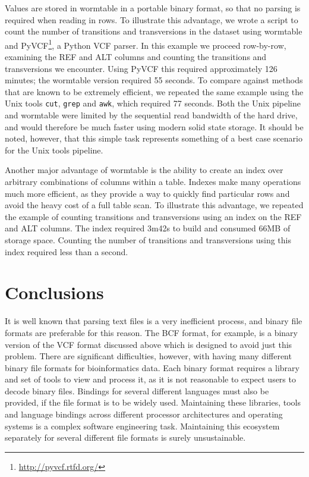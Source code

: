 \documentclass{bioinfo}
\begin{document}
Values are stored in wormtable in a portable binary format, so that no parsing is
required when reading in rows. To illustrate this advantage, we
wrote a script to count the number of transitions and transversions
in the dataset using wormtable and PyVCF\footnote{%
\href{http://pyvcf.rtfd.org/}{http://pyvcf.rtfd.org/}}, 
a Python VCF parser.
In this example we proceed 
row-by-row, examining the REF and ALT columns and
counting the transitions and transversions we encounter. 
Using PyVCF this required approximately 126 minutes;
the wormtable version required
55 seconds. To compare against methods that are known to be extremely
efficient, we repeated the same 
example using the Unix tools \texttt{cut}, \texttt{grep} 
and \texttt{awk},  which required 77 seconds. Both the
Unix pipeline and wormtable were limited by the sequential read
bandwidth of the hard drive, and would therefore be much 
faster using modern solid state storage.
It should be noted, however, that this simple task represents 
something of a best case scenario for the Unix tools pipeline.

Another major advantage of wormtable is the ability to create 
an index over arbitrary combinations of columns within a table.
Indexes make many operations much more efficient, as they provide 
a way to quickly find particular rows and avoid the 
heavy cost of a full table scan.
To illustrate this advantage, we repeated the example 
of counting transitions and transversions using an index 
on the REF and ALT columns.
The index required 3m42s to build and 
consumed 66MB of storage space. Counting the number of 
transitions and transversions using this index required 
less than a second.

\section{Conclusions}
It is well known that parsing text files is a very inefficient process, 
and binary file formats are preferable for this reason. The BCF format,
for example, is a binary version of the VCF format discussed above which 
is designed to avoid just this problem. There are significant difficulties,
however, with having many different binary file formats for bioinformatics 
data. Each binary format requires a library and set of tools to view 
and process it, as it is not reasonable to expect users to decode binary
files. Bindings for several different languages must also be provided, if 
the file format is to be widely used.
Maintaining these libraries, tools and language bindings across 
different processor architectures and operating systems
is a complex software engineering task. Maintaining this ecosystem 
separately for several different file formats is surely 
unsustainable.
\end{document}
